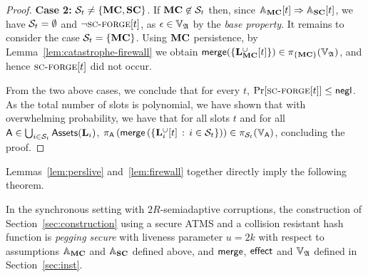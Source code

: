 \begin{proof}
  \textbf{Case 2:}
  $\Secure_t \neq \{\Mainchain,\Sidechain\}$.
  If $\Mainchain\not\in\Secure_t$ then, since
  $\Assum_\Mainchain[t] \Rightarrow \Assum_\Sidechain[t]$, we have $\Secure_t = \emptyset$ and
  $\lnot \textsc{sc-forge}[t]$, as $\epsilon \in \adalang$ by the
  \emph{base property}.
  It remains to consider the case $\Secure_t = \{\Mainchain\}$. Using $\Mainchain$ persistence,
  by Lemma~\ref{lem:catastrophe-firewall} we obtain
  $\merge(\{\Ledger_\Mainchain^{\cup}[t]\}) \in \proj_{\{\Mainchain\}}(\adalang)$,
  and hence $\scforge[t]$ did not occur.

  From the two above cases, we conclude that for every $t$,
  $\Pr[\textsc{sc-forge}[t]] \leq \textsf{negl}$. As the total number of slots is
  polynomial,
  we have shown that with overwhelming probability,
  we have that for all slots $t$ and for all
  $\Asset\in\bigcup_{i\in\Secure_t}\Assets(\Ledger_i)$,
  $
  \proj_{\Asset}\left(
    \merge\left(
      \setd
        {\Ledger_i^{\cup}[t]}
        {i\in\Secure_t}
    \right)
  \right)
  \in
  \proj_{\Secure_t}(\ValLang_\Asset)
  $, concluding the proof.
\end{proof}

  Lemmas~\ref{lem:perslive} and~\ref{lem:firewall} together directly imply the
  following theorem.

\begin{theorem}
  \label{thm:security}
  In the synchronous setting
  with $2R$-semiadaptive corruptions, the construction of
  Section~\ref{sec:construction} using a secure ATMS and a collision resistant
  hash function is \textit{pegging secure} with liveness parameter
  $u=2k$
  with respect to
  assumptions $\Assum_\Mainchain$ and $\Assum_\Sidechain$ defined above,
  and $\merge$, $\effect$ and
  $\adalang$ defined in Section~\ref{sec:inst}.
\end{theorem}
